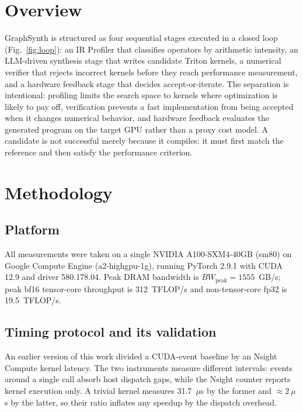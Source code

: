 \documentclass[10pt,twocolumn]{article}
\begin{document}
\section{Overview}

GraphSynth is structured as four sequential stages executed in a closed loop
(Fig.~\ref{fig:loop}): an IR Profiler that classifies operators by arithmetic
intensity, an LLM-driven synthesis stage that writes candidate Triton kernels, a
numerical verifier that rejects incorrect kernels before they reach performance
measurement, and a hardware feedback stage that decides accept-or-iterate. The
separation is intentional: profiling limits the search space to kernels where
optimization is likely to pay off, verification prevents a fast implementation from
being accepted when it changes numerical behavior, and hardware feedback evaluates the
generated program on the target GPU rather than a proxy cost model. A candidate is not
successful merely because it compiles: it must first match the reference and then
satisfy the performance criterion.

\section{Methodology}

\subsection{Platform}

All measurements were taken on a single NVIDIA A100-SXM4-40GB (sm80) on Google Compute
Engine (a2-highgpu-1g), running PyTorch 2.9.1 with CUDA 12.9 and driver
580.178.04. Peak DRAM bandwidth is $BW_{\text{peak}}=1555$~GB/s; peak bf16
tensor-core throughput is 312~TFLOP/s and non-tensor-core fp32 is 19.5~TFLOP/s.

\subsection{Timing protocol and its validation}

An earlier version of this work divided a CUDA-event baseline by an Nsight Compute
kernel latency. The two instruments measure different intervals: events around a single
call absorb host dispatch gaps, while the Nsight counter reports kernel execution only.
A trivial kernel measures 31.7~$\mu$s by the former and ${\approx}2~\mu$s by the latter,
so their ratio inflates any speedup by the dispatch overhead.
\end{document}
